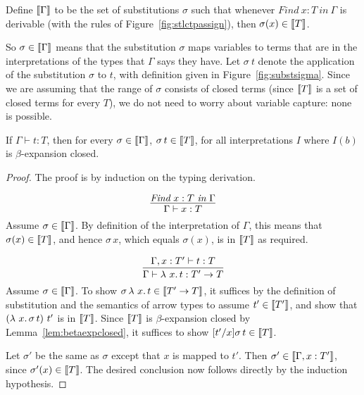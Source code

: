 \begin{definition}
  \label{def:substmodels}
  Define $\llbracket \Gamma \rrbracket$ to be the set of substitutions $\sigma$ such that
  whenever $\textit{Find}\ x:T\ \textit{in}\ \Gamma$ is derivable (with the rules of Figure~\ref{fig:stlctpassign}),
  then $\sigma(x) \in \llbracket T \rrbracket$.
\end{definition}

So $\sigma\in\llbracket \Gamma \rrbracket$ means that the substitution $\sigma$
maps variables to terms that are in the interpretations of the types
that $\Gamma$ says they have.  Let $\sigma\ t$ denote the 
application of the substitution $\sigma$ to $t$, with definition
given in Figure~\ref{fig:substsigma}.  Since we are assuming that the
range of $\sigma$ consists of closed terms (since $\llbracket T \rrbracket$ is a set
of closed terms for every $T$), we do not need to worry
about variable capture: none is possible.

\begin{theorem}
  \label{thm:sltcsnd}
  If $\Gamma\vdash t : T$, then for every $\sigma\in\llbracket \Gamma \rrbracket$, $\sigma\, t \in \llbracket T \rrbracket$,
  for all interpretations $I$ where $I(b)$ is $\beta$-expansion closed.
\end{theorem}
\begin{proof}
  The proof is by induction on the typing derivation.

  \case{ }
\[  \infer{\Gamma\vdash x : T}{\textit{Find}\ x:T\ \textit{in}\ \Gamma} 
\]
Assume $\sigma \in \llbracket \Gamma \rrbracket$.  By definition of the interpretation
of $\Gamma$, this means that $\sigma(x) \in\llbracket T \rrbracket$, and hence $\sigma\,x$, which equals $\sigma(x)$,
is in $\llbracket T \rrbracket$ as required.

  \case{ }
\[  \infer{\Gamma\vdash \lam{x}{t} : T' \to T}
      {\Gamma,x:T'\vdash t:T}
\]
Assume $\sigma\in\llbracket \Gamma \rrbracket$.  To show $\sigma\,\lambda\ x.\, t\in\llbracket T'\to T \rrbracket$, it suffices
by the definition of substitution and the semantics of arrow types to assume $t'\in\llbracket T' \rrbracket$,
and show that $(\lambda\ x.\, \sigma\, t)\ t'$ is in $\llbracket T \rrbracket$.  Since $\llbracket T \rrbracket$ is $\beta$-expansion closed
by Lemma~\ref{lem:betaexpclosed}, it suffices to show $[t'/x]\sigma\, t\in\llbracket T \rrbracket$.

Let $\sigma'$ be the same as $\sigma$ except that $x$ is mapped to $t'$.
Then $\sigma'\in\llbracket \Gamma,x:T' \rrbracket$, since $\sigma'(x)\in\llbracket T \rrbracket$.  The desired conclusion
now follows directly by the induction hypothesis.
\end{proof}

